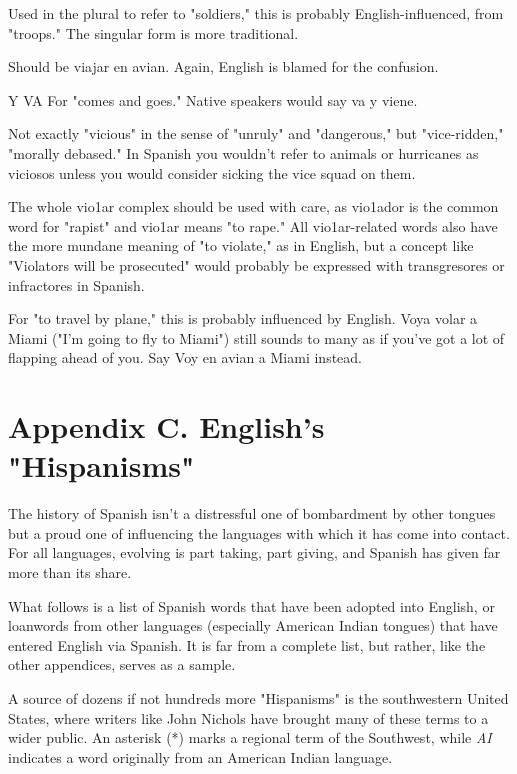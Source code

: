 { Used in the plural to refer to "soldiers," this is
probably English-influenced, from "troops." The singular form is
more traditional.

 Should be viajar en avian. Again, English is blamed for the confusion.

 Y VA For "comes and goes." Native speakers would say
va y viene.

 Not exactly "vicious" in the sense of "unruly" and
"dangerous," but "vice-ridden," "morally debased." In Spanish you
wouldn't refer to animals or hurricanes as viciosos unless you would
consider sicking the vice squad on them.

 The whole vio1ar complex should be used with
care, as vio1ador is the common word for "rapist" and vio1ar means
"to rape." All vio1ar-related words also have the more mundane meaning of "to violate," as in English, but a concept like "Violators will be
prosecuted" would probably be expressed with transgresores or infractores in Spanish.

 For "to travel by plane," this is probably influenced
by English. Voya volar a Miami ("I'm going to fly to Miami") still
sounds to many as if you've got a lot of flapping ahead of you. Say Voy
en avian a Miami instead.

\chapter{Appendix C. English's "Hispanisms"}

The history of Spanish isn't a distressful one of bombardment
by other tongues but a proud one of influencing the languages with
which it has come into contact. For all languages, evolving is part taking, part giving, and Spanish has given far more than its share.

What follows is a list of Spanish words that have been adopted
into English, or loanwords from other languages (especially American
Indian tongues) that have entered English via Spanish. It is far from a
complete list, but rather, like the other appendices, serves as a sample.

A source of dozens if not hundreds more "Hispanisms" is the
southwestern United States, where writers like John Nichols have
brought many of these terms to a wider public. An asterisk (*) marks a
regional term of the Southwest, while \emph{AI} indicates a word originally
from an American Indian language.

}
